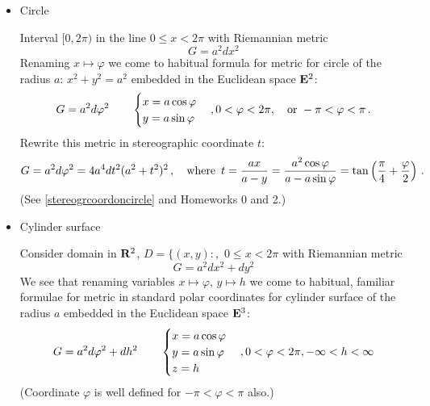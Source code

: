 \documentclass[12pt]{article}
\theoremstyle{theorem}
\numberwithin{equation}{section}
\begin{document}
\begin{itemize}
    \item   Circle

     Interval $[0,2\pi)$ in the line $0\leq x< 2\pi$ with Riemannian  metric
           \begin{equation}\label{circle1}
          G=  a^2dx^2
           \end{equation}
Renaming $x\mapsto \varphi $ we come to habitual formula for
metric
for circle of the radius $a$: $x^2+y^2=a^2$ embedded in
the Euclidean space ${\bf E}^2$:
           \begin{equation}\label{circle2}
          G= a^2d\varphi^2\qquad
          \begin{cases}
          x=a\cos\varphi\cr
          y=a\sin\varphi
          \end {cases},
          0< \varphi <2\pi,
\quad {\rm or}\,\, -\pi<\varphi<\pi\,.
           \end{equation}
  Rewrite this metric in stereographic coordinate
   $t$:
                \begin{equation}\label{circlestereograph} 
             G=a^2d\varphi^2=4a^4dt^2(a^2+t^2)^2\,,
\quad {\rm where}\,\,\,
       t={ax\over a-y}=
      {a^2\cos\varphi\over a-a\sin\varphi}=
\tan\left({\pi\over 4}+{\varphi\over 2}\right)\,.
                  \end{equation}
  (See \eqref{stereogrcoordoncircle} and Homeworks 0 and 2.)



    \item Cylinder surface

    Consider domain in ${\bf R}^2$,
 $D=\{(x,y)\colon,\,\, 0\leq x< 2\pi$ with Riemannian  metric
           \begin{equation}\label{domainascylinder1}
          G=  a^2dx^2+dy^2
           \end{equation}
We see that renaming variables $x\mapsto \varphi $, $y\mapsto h$ we come to habitual, familiar formulae for
metric in standard polar coordinates
for cylinder surface of the radius $a$ embedded in the Euclidean space ${\bf E}^3$:
           \begin{equation}\label{domainascylinder2}
          G= a^2d\varphi^2+dh^2\qquad
          \begin{cases}
          x=a\cos\varphi\cr
          y=a\sin\varphi\cr
          z=h\cr
          \end {cases},
          0< \varphi <2\pi, -\infty<h<\infty
           \end{equation}
(Coordinate  $\varphi$ is well defined for $-\pi<\varphi<\pi$
also.)


\end{itemize}
\end{document}
